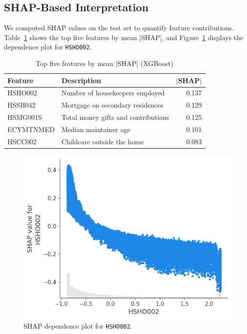 \documentclass{article}
\begin{document}
\subsection{SHAP-Based Interpretation}
We computed SHAP values on the test set to quantify feature contributions. Table~\ref{tab:shap_top5} shows the top five features by mean |SHAP|, and Figure~\ref{fig:shap_hsho002} displays the dependence plot for \texttt{HSHO002}.

\begin{table}[ht]
  \centering
  \caption{Top five features by mean |SHAP| (XGBoost)}
  \begin{tabular}{llr}
    \toprule
    \textbf{Feature} & \textbf{Description}                       & $\mathbf{\overline{\lvert\text{SHAP}\rvert}}$ \\
    \midrule
    HSHO002  & Number of housekeepers employed            & 0.137 \\
    HSSH042  & Mortgage on secondary residences           & 0.129 \\
    HSMG001S & Total money gifts and contributions        & 0.125 \\
    ECYMTNMED& Median maintainer age                     & 0.101 \\
    HSCC002  & Childcare outside the home                 & 0.083 \\
    \bottomrule
  \end{tabular}
  \label{tab:shap_top5}
\end{table}

\begin{figure}[ht]
  \centering
  \includegraphics[width=0.75\linewidth]{figures/shap_dependence_hsho002.png}
  \caption{SHAP dependence plot for \texttt{HSHO002}.}
  \label{fig:shap_hsho002}
\end{figure}
\end{document}
